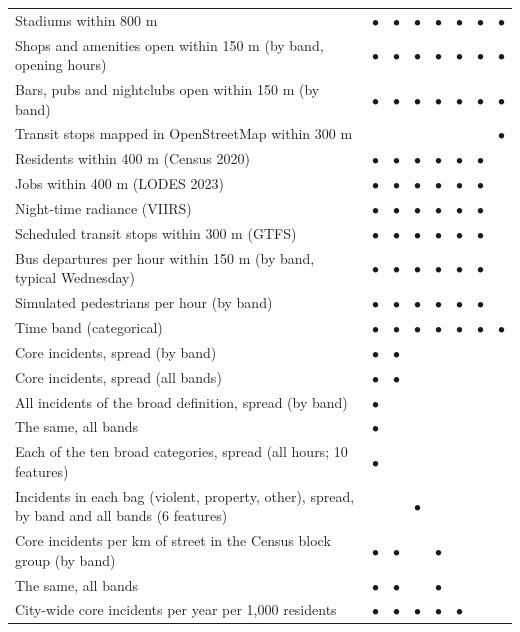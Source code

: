 \begin{tabular}{p{}ccccccc}
Stadiums within 800 m & $\bullet$ & $\bullet$ & $\bullet$ & $\bullet$ & $\bullet$ & $\bullet$ & $\bullet$ \\
Shops and amenities open within 150 m (by band, opening hours) & $\bullet$ & $\bullet$ & $\bullet$ & $\bullet$ & $\bullet$ & $\bullet$ & $\bullet$ \\
Bars, pubs and nightclubs open within 150 m (by band) & $\bullet$ & $\bullet$ & $\bullet$ & $\bullet$ & $\bullet$ & $\bullet$ & $\bullet$ \\
Transit stops mapped in OpenStreetMap within 300 m &  &  &  &  &  &  & $\bullet$ \\
Residents within 400 m (Census 2020) & $\bullet$ & $\bullet$ & $\bullet$ & $\bullet$ & $\bullet$ & $\bullet$ &  \\
Jobs within 400 m (LODES 2023) & $\bullet$ & $\bullet$ & $\bullet$ & $\bullet$ & $\bullet$ & $\bullet$ &  \\
Night-time radiance (VIIRS) & $\bullet$ & $\bullet$ & $\bullet$ & $\bullet$ & $\bullet$ & $\bullet$ &  \\
Scheduled transit stops within 300 m (GTFS) & $\bullet$ & $\bullet$ & $\bullet$ & $\bullet$ & $\bullet$ & $\bullet$ &  \\
Bus departures per hour within 150 m (by band, typical Wednesday) & $\bullet$ & $\bullet$ & $\bullet$ & $\bullet$ & $\bullet$ & $\bullet$ &  \\
Simulated pedestrians per hour (by band) & $\bullet$ & $\bullet$ & $\bullet$ & $\bullet$ & $\bullet$ & $\bullet$ &  \\
Time band (categorical) & $\bullet$ & $\bullet$ & $\bullet$ & $\bullet$ & $\bullet$ & $\bullet$ & $\bullet$ \\
\midrule
Core incidents, spread (by band) & $\bullet$ & $\bullet$ &  &  &  &  &  \\
Core incidents, spread (all bands) & $\bullet$ & $\bullet$ &  &  &  &  &  \\
All incidents of the broad definition, spread (by band) & $\bullet$ &  &  &  &  &  &  \\
The same, all bands & $\bullet$ &  &  &  &  &  &  \\
Each of the ten broad categories, spread (all hours; 10 features) & $\bullet$ &  &  &  &  &  &  \\
Incidents in each bag (violent, property, other), spread, by band and all bands (6 features) &  &  & $\bullet$ &  &  &  &  \\
Core incidents per km of street in the Census block group (by band) & $\bullet$ & $\bullet$ &  & $\bullet$ &  &  &  \\
The same, all bands & $\bullet$ & $\bullet$ &  & $\bullet$ &  &  &  \\
City-wide core incidents per year per 1,000 residents & $\bullet$ & $\bullet$ & $\bullet$ & $\bullet$ & $\bullet$ &  &  \\
\bottomrule
\end{tabular}
